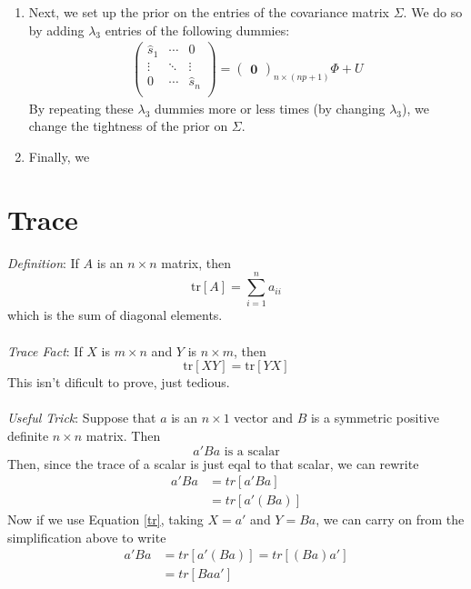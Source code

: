 \documentclass[a4paper,12pt]{scrartcl}
\begin{document}
\begin{enumerate}
    \item Next, we set up the prior on the entries of the
	covariance matrix $\Sigma$. We do so by adding
	$\lambda_3$ entries of the following dummies:
	\begin{align*}
	    \begin{pmatrix} 
		\hat{s}_1 &  \cdots & 0 \\
		\vdots & \ddots & \vdots \\
		0 & \cdots & \hat{s}_n \\
	    \end{pmatrix} = \begin{pmatrix}\mathbf{0} 
		\end{pmatrix}_{n \times (np+1)} \Phi + U
	\end{align*}
	By repeating these $\lambda_3$ dummies more or less
	times (by changing $\lambda_3$), we change the tightness
	of the prior on $\Sigma$. 

    \item Finally, we 


\end{enumerate}


\newpage
\appendix
\section{Trace}

{\sl Definition}: If $A$ is an $n\times n$ matrix, then 
\begin{equation}
    \text{tr}[A] = \sum^n_{i=1} a_{ii} 
\end{equation}
which is the sum of diagonal elements.
\\
\\
{\sl Trace Fact}: If $X$ is $m\times n$ and $Y$
is $n\times m$, then
\begin{equation}
    \label{tr}
    \text{tr}[XY] = \text{tr}[YX]
\end{equation}
This isn't dificult to prove, just tedious. 
\\
\\
{\sl Useful Trick}: Suppose that $a$ is an 
$n\times 1$ vector and $B$ is a symmetric
positive definite $n\times n$ matrix. Then 
    \[ a' B a \text{ is a scalar} \]
Then, since the trace of a scalar is just eqal
to that scalar, we can rewrite
\begin{align*}
    a' B a &= tr\left[a' B a \right] \\
    &= tr\left[a' (B a) \right] 
\end{align*}
Now if we use Equation \ref{tr}, taking $X = a'$ and
$Y = Ba$, we can carry on from the simplification
above to write
\begin{align*}
    a' B a &= tr\left[a' (B a) \right]  
	= tr\left[(B a) a' \right]  \\
	&= tr\left[B a a' \right]
\end{align*}
\end{document}
